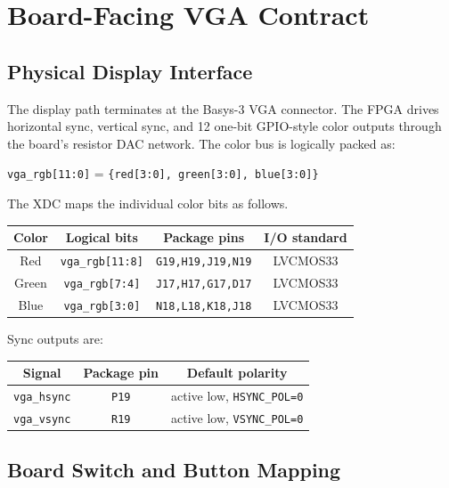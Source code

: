 \documentclass{article}
\newcommand{\sig}[1]{\begingroup\nolinkurl{#1}\endgroup}
\newcommand{\param}[1]{\begingroup\nolinkurl{#1}\endgroup}
\begin{document}
\section{Board-Facing VGA Contract}

\subsection{Physical Display Interface}

The display path terminates at the Basys-3 VGA connector.  The FPGA drives
horizontal sync, vertical sync, and 12 one-bit GPIO-style color outputs through
the board's resistor DAC network.  The color bus is logically packed as:

\begin{center}
\sig{vga_rgb[11:0]} = \sig{\{red[3:0], green[3:0], blue[3:0]\}}
\end{center}

The XDC maps the individual color bits as follows.

\begin{center}
\begin{tabular}{c c c c}
\toprule
\textbf{Color} & \textbf{Logical bits} & \textbf{Package pins} & \textbf{I/O standard} \\
\midrule
Red   & \sig{vga_rgb[11:8]} & \sig{G19,H19,J19,N19} & LVCMOS33 \\
Green & \sig{vga_rgb[7:4]}  & \sig{J17,H17,G17,D17} & LVCMOS33 \\
Blue  & \sig{vga_rgb[3:0]}  & \sig{N18,L18,K18,J18} & LVCMOS33 \\
\bottomrule
\end{tabular}
\end{center}

Sync outputs are:
\begin{center}
\begin{tabular}{c c c}
\toprule
\textbf{Signal} & \textbf{Package pin} & \textbf{Default polarity} \\
\midrule
\sig{vga_hsync} & \sig{P19} & active low, \param{HSYNC_POL=0} \\
\sig{vga_vsync} & \sig{R19} & active low, \param{VSYNC_POL=0} \\
\bottomrule
\end{tabular}
\end{center}

\subsection{Board Switch and Button Mapping}
\end{document}
